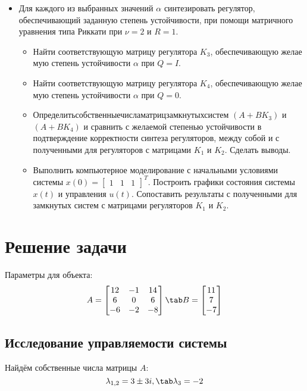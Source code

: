 \begin{itemize}
\begin{itemize}
  \end{itemize}
\item Для каждого из выбранных значений $\alpha$ синтезировать регулятор, обеспечивающий заданную степень устойчивости, при помощи матричного
 уравнения типа Риккати при $\nu = 2$ и $R =1$.
\begin{itemize}
  \item Найти соответствующую матрицу регулятора $K_3$, обеспечивающую желае
  мую степень устойчивости $\alpha$ при $Q = I$.
  \item Найти соответствующую матрицу регулятора $K_4$, обеспечивающую желае
  мую степень устойчивости $\alpha$ при $Q = 0$.
  \item Определитьсобственныечисламатрицзамкнутыхсистем $(A+BK_3)$ и $(A+BK_4)$
   и сравнить с желаемой степенью устойчивости в подтверждение корректности синтеза регуляторов, 
   между собой и с полученными для регуляторов с матрицами $K_1$ и $K_2$. Сделать выводы.
  \item Выполнить компьютерное моделирование с начальными условиями системы 
  $x(0) = \begin{bmatrix} 1&1&1 \end{bmatrix}^T$.  Построить  графики состояния системы $x(t)$ и управления $u(t)$. 
  Сопоставить результаты с полученными для замкнутых систем с матрицами регуляторов $K_1$ и $K_2$.
\end{itemize}
\end{itemize}

\newpage
\section{Решение задачи}

Параметры для объекта:
$$
  A = \begin{bmatrix}
  12 & -1 & 14 \\
  6 & 0 & 6 \\
  -6 & -2 & -8 
  \end{bmatrix} \tab
  B = \begin{bmatrix}
    11 \\ 7 \\ -7 
  \end{bmatrix}
$$

\subsection{Исследование управляемости системы}

Найдём собственные числа матрицы $A$:
$$
    \lambda_{1,2} = 3 \pm 3i, \tab \lambda_3 = -2
$$

